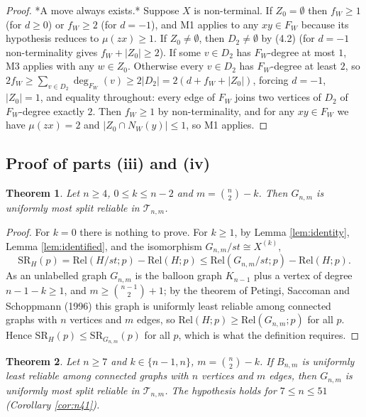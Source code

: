 \documentclass[
  11pt,
]{article}
\newtheorem{theorem}{Theorem}[section]
\theoremstyle{definition}
\theoremstyle{remark}
\begin{document}
\begin{proof}
*A move always exists.* Suppose $X$ is non-terminal. If $Z_0=\emptyset$ then $f_W\ge1$ (for $d\ge0$) or $f_W\ge2$ (for $d=-1$), and M1 applies to any $xy\in F_W$ because its hypothesis reduces to $\mu(zx)\ge1$. If $Z_0\ne\emptyset$, then $D_2\ne\emptyset$ by (4.2) (for $d=-1$ non-terminality gives $f_W+|Z_0|\ge2$). If some $v\in D_2$ has $F_W$-degree at most $1$, M3 applies with any $w\in Z_0$. Otherwise every $v\in D_2$ has $F_W$-degree at least $2$, so $2f_W\ge\sum_{v\in D_2}\deg_{F_W}(v)\ge2|D_2|=2(d+f_W+|Z_0|)$, forcing $d=-1$, $|Z_0|=1$, and equality throughout: every edge of $F_W$ joins two vertices of $D_2$ of $F_W$-degree exactly $2$. Then $f_W\ge1$ by non-terminality, and for any $xy\in F_W$ we have $\mu(zx)=2$ and $|Z_0\cap N_W(y)|\le1$, so M1 applies.
\end{proof}

\subsection{Proof of parts (iii) and
(iv)}\label{proof-of-parts-iii-and-iv}

\begin{theorem}\label{thm:B}
Let $n\ge 4$, $0\le k\le n-2$ and $m=\binom n2-k$. Then $G_{n,m}$ is uniformly most split reliable in $\mathcal T_{n,m}$.
\end{theorem}

\begin{proof}
For $k=0$ there is nothing to prove. For $k\ge1$, by Lemma \ref{lem:identity}, Lemma \ref{lem:identified}, and the isomorphism $G_{n,m}/st\cong X^{(k)}$,
$$\mathrm{SR}_H(p)=\mathrm{Rel}(H/st;p)-\mathrm{Rel}(H;p)\le\mathrm{Rel}(G_{n,m}/st;p)-\mathrm{Rel}(H;p).$$
As an unlabelled graph $G_{n,m}$ is the balloon graph $K_{n-1}$ plus a vertex of degree $n-1-k\ge1$, and $m\ge\binom{n-1}2+1$; by the theorem of Petingi, Saccoman and Schoppmann (1996) this graph is uniformly least reliable among connected graphs with $n$ vertices and $m$ edges, so $\mathrm{Rel}(H;p)\ge\mathrm{Rel}(G_{n,m};p)$ for all $p$. Hence $\mathrm{SR}_H(p)\le\mathrm{SR}_{G_{n,m}}(p)$ for all $p$, which is what the definition requires.
\end{proof}

\begin{theorem}\label{thm:Bprime}
Let $n\ge 7$ and $k\in\{n-1,n\}$, $m=\binom n2-k$. If $B_{n,m}$ is uniformly least reliable among connected graphs with $n$ vertices and $m$ edges, then $G_{n,m}$ is uniformly most split reliable in $\mathcal T_{n,m}$. The hypothesis holds for $7\le n\le 51$ (Corollary \ref{cor:n41}).
\end{theorem}
\end{document}
